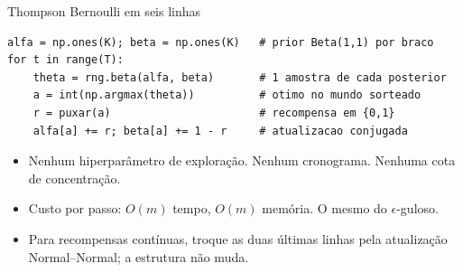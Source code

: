 \documentclass[aspectratio=169, 11pt]{beamer}
\begin{document}
\begin{frame}[fragile]{Thompson Bernoulli em seis linhas}
\small
\begin{verbatim}
alfa = np.ones(K); beta = np.ones(K)   # prior Beta(1,1) por braco
for t in range(T):
    theta = rng.beta(alfa, beta)       # 1 amostra de cada posterior
    a = int(np.argmax(theta))          # otimo no mundo sorteado
    r = puxar(a)                       # recompensa em {0,1}
    alfa[a] += r; beta[a] += 1 - r     # atualizacao conjugada
\end{verbatim}
\normalsize

  \begin{itemize}
    \item Nenhum hiperparâmetro de exploração. Nenhum cronograma. Nenhuma
          cota de concentração.
    \item Custo por passo: $O(m)$ tempo, $O(m)$ memória. O mesmo do
          $\epsilon$-guloso.
    \item Para recompensas contínuas, troque as duas últimas linhas pela
          atualização Normal--Normal; a estrutura não muda.
  \end{itemize}
\end{frame}
\end{document}
